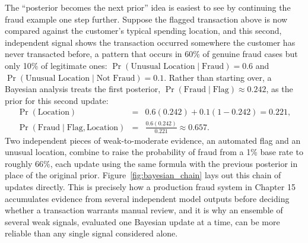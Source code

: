 \documentclass[../ai_in_finance]{subfiles}
\begin{document}
The ``posterior becomes the next prior'' idea is easiest to see by continuing the fraud example one step further. Suppose the flagged transaction above is now compared against the customer's typical spending location, and this second, independent signal shows the transaction occurred somewhere the customer has never transacted before, a pattern that occurs in 60\% of genuine fraud cases but only 10\% of legitimate ones: $\Pr(\text{Unusual Location}\mid\text{Fraud}) = 0.6$ and $\Pr(\text{Unusual Location}\mid\text{Not Fraud}) = 0.1$. Rather than starting over, a Bayesian analysis treats the first posterior, $\Pr(\text{Fraud}\mid\text{Flag}) \approx 0.242$, as the prior for this second update:
\begin{eqnarray*}
\Pr(\text{Location}) &=& 0.6(0.242) + 0.1(1-0.242) = 0.221, \\
\Pr(\text{Fraud}\mid\text{Flag},\text{Location}) &=& \frac{0.6(0.242)}{0.221} \approx 0.657.
\end{eqnarray*}
Two independent pieces of weak-to-moderate evidence, an automated flag and an unusual location, combine to raise the probability of fraud from a 1\% base rate to roughly 66\%, each update using the same formula with the previous posterior in place of the original prior. Figure~\ref{fig:bayesian_chain} lays out this chain of updates directly. This is precisely how a production fraud system in Chapter 15 accumulates evidence from several independent model outputs before deciding whether a transaction warrants manual review, and it is why an ensemble of several weak signals, evaluated one Bayesian update at a time, can be more reliable than any single signal considered alone.

\begin{figure}[htbp]
\centering
\begin{lrbox}{\bookmeasuredbox}
\end{lrbox}
\ifdim\wd\bookmeasuredbox<0.65\linewidth
\setlength{\bookcapwidth}{0.65\linewidth}
\else
\setlength{\bookcapwidth}{\wd\bookmeasuredbox}
\fi
{}
\end{figure}
\end{document}
